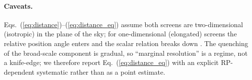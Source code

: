 \paragraph{Caveats.} Eqs.~(\ref{eq:distance})--(\ref{eq:distance_eq}) assume
both screens are two-dimensional (isotropic) in the plane of the sky; for
one-dimensional (elongated) screens the relative position angle enters and
the scalar relation breaks down \citep{Pradeep2025}. The quenching of the
broad-scale component is gradual, so ``marginal resolution'' is a regime,
not a knife-edge; we therefore report Eq.~(\ref{eq:distance_eq}) with an
explicit RP-dependent systematic rather than as a point estimate.
